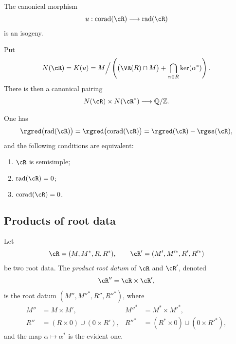 \begin{lemma}\label{sga3:XXI:6.3.4}
The canonical morphism
\[
 u:\operatorname{corad}(\cR)\longrightarrow\operatorname{rad}(\cR)
\]
is an isogeny.
\end{lemma}

\begin{definition}\label{sga3:XXI:6.3.5}
Put
\[
 N(\cR)=K(u)
 =
 M\Big/
 \left(
   \bigl(\VR(R)\cap M\bigr)
   +\bigcap_{\alpha\in R}\ker(\alpha^\ast)
 \right).
\]
There is then a canonical pairing
\[
 N(\cR)\times N(\cR^\ast)\longrightarrow\mathbb Q/\mathbb Z.
\]
\end{definition}

\begin{lemma}\label{sga3:XXI:6.3.6}
One has
\[
 \rgred\bigl(\operatorname{rad}(\cR)\bigr)
 =
 \rgred\bigl(\operatorname{corad}(\cR)\bigr)
 =
 \rgred(\cR)-\rgss(\cR),
\]
and the following conditions are equivalent:
\begin{enumerate}
\item[(i)] \(\cR\) is semisimple;
\item[(ii)] \(\operatorname{rad}(\cR)=0\);
\item[(iii)] \(\operatorname{corad}(\cR)=0\).
\end{enumerate}
\end{lemma}


\subsection{Products of root data}\label{sga3:XXI:6.4}

\begin{definition}\label{sga3:XXI:6.4.1}
Let
\[
 \cR=(M,M^\ast,R,R^\ast),
 \qquad
 \cR'=(M',M'^\ast,R',R'^\ast)
\]
be two root data. The \emph{product root datum} of \(\cR\) and
\(\cR'\), denoted
\[
 \cR''=\cR\times\cR',
\]
is the root datum \((M'',M''^\ast,R'',R''^\ast)\), where
\[
\begin{aligned}
 M''&=M\times M',
 &M''^\ast&=M^\ast\times M'^\ast,\\
 R''&=(R\times0)\cup(0\times R'),
 &R''^\ast&=(R^\ast\times0)\cup(0\times R'^\ast),
\end{aligned}
\]
and the map \(\alpha\mapsto\alpha^\ast\) is the evident one.
\end{definition}

